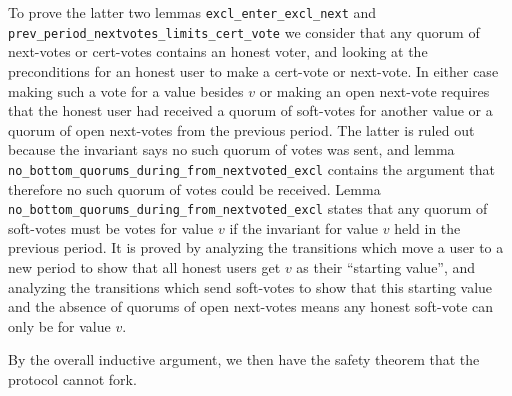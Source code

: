 To prove the latter two lemmas \lstinline{excl_enter_excl_next} and
\lstinline{prev_period_nextvotes_limits_cert_vote} we consider that any quorum
of next-votes or cert-votes contains an honest voter, and looking at the
preconditions for an honest user to make a cert-vote or next-vote.
In either case making such a vote for a value besides $v$ or making an open
next-vote requires that the honest user had received a quorum of
soft-votes for another value or a quorum of open next-votes from the
previous period.
The latter is ruled out because the invariant says no such quorum of votes
was sent, and lemma \lstinline{no_bottom_quorums_during_from_nextvoted_excl}
contains the argument that therefore no such quorum of votes could
be received.
Lemma \lstinline{no_bottom_quorums_during_from_nextvoted_excl}
states that any quorum of soft-votes must be votes for value $v$ if the
invariant for value $v$ held in the previous period.
It is proved by analyzing the transitions which move a user to a new period
to show that all honest users get $v$ as their ``starting value'',
and analyzing the transitions which send soft-votes to show that this
starting value and the absence of quorums of open next-votes means any honest
soft-vote can only be for value $v$.

By the overall inductive argument, we then have the safety theorem that the
protocol cannot fork.